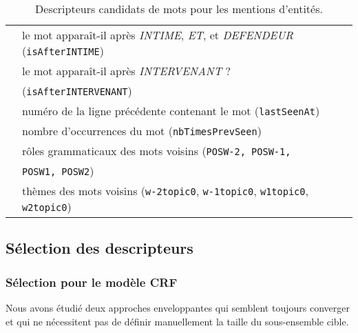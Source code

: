 \begin{table}[!htb]
\begin{tabular}{|l|p{}|}
	& \tabitem \og le mot apparaît-il après \textit{INTIME}, \textit{ET}, et \textit{DEFENDEUR} \fg{} (\verb|isAfterINTIME|)\\
	& \tabitem \og le mot apparaît-il après  \textit{INTERVENANT} ? \fg{} \\ 
	& (\verb|isAfterINTERVENANT|) \\
	& \tabitem numéro de la ligne précédente contenant le mot (\verb|lastSeenAt|)\\
	& \tabitem nombre d'occurrences du mot (\verb|nbTimesPrevSeen|)\\
	& \tabitem rôles grammaticaux des mots voisins (\texttt{POSW-2, POSW-1,} \\ 
	& \texttt{POSW1, POSW2}) \\ 
	& \tabitem thèmes des mots voisins (\verb|w-2topic0|, \verb|w-1topic0|, \verb|w1topic0|, \verb|w2topic0|) \\ 
	 \hline
	\end{tabular}	
	\caption{Descripteurs candidats de mots pour les mentions d'entités.} \label{tab:structuration:descripteursmots}
\end{table}

\subsection{Sélection des descripteurs}
\subsubsection{Sélection  pour le modèle CRF}
 Nous avons étudié deux approches enveloppantes qui semblent toujours converger et qui ne nécessitent pas de définir manuellement la taille du sous-ensemble cible. %

